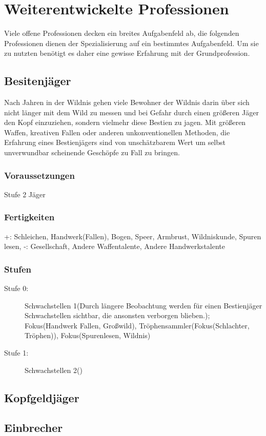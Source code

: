 \documentclass[a4paper,12pt,oneside]{book}
\begin{document}
\chapter{Weiterentwickelte Professionen}
Viele offene Professionen decken ein breites Aufgabenfeld ab, die folgenden Professionen dienen der Spezialisierung auf ein bestimmtes Aufgabenfeld. Um sie zu nutzten benötigt es daher eine gewisse Erfahrung mit der Grundprofession.
\section{Besitenjäger}
Nach Jahren in der Wildnis gehen viele Bewohner der Wildnis darin über sich nicht länger mit dem Wild zu messen und bei Gefahr durch einen größeren Jäger den Kopf einzuziehen, sondern vielmehr diese Bestien zu jagen. Mit größeren Waffen, kreativen Fallen oder anderen unkonventionellen Methoden, die Erfahrung eines Bestienjägers sind von unschätzbarem Wert um selbst unverwundbar scheinende Geschöpfe zu Fall zu bringen.
\subsection{Voraussetzungen}
Stufe 2 Jäger
\subsection{Fertigkeiten}
+: Schleichen, Handwerk(Fallen), Bogen, Speer, Armbrust, Wildniskunde, Spuren lesen, 
-: Gesellschaft, Andere Waffentalente, Andere Handwerkstalente
\subsection{Stufen}
\begin{description}
\item[Stufe 0:] Schwachstellen 1(Durch längere Beobachtung werden für einen Bestienjäger Schwachstellen sichtbar, die ansonsten verborgen blieben.); Fokus(Handwerk Fallen, Großwild), Tröphensammler(Fokus(Schlachter, Tröphen)), Fokus(Spurenlesen, Wildnis)
\item[Stufe 1:] Schwachstellen 2()
\end{description}
\section{Kopfgeldjäger}
\section{Einbrecher}
\end{document}
